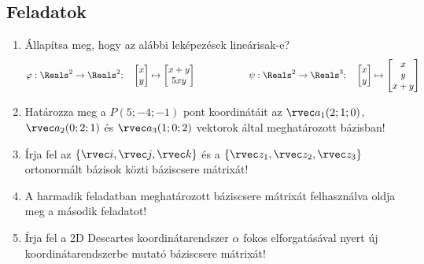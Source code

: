 \documentclass[a4paper, 12pt]{scrartcl}
\begin{document}
\clearpage
\subsection{Feladatok}
\begin{enumerate}
  \item Állapítsa meg, hogy az alábbi leképezések lineárisak-e?
        $$
          \varphi: \Reals^2 \to \Reals^2;
          \quad
          \begin{bmatrix}
            x \\
            y
          \end{bmatrix} \mapsto \begin{bmatrix}
            x+y \\
            5xy
          \end{bmatrix}
          \hspace{2cm}
          \psi: \Reals^2 \to \Reals^3;
          \quad
          \begin{bmatrix}
            x \\
            y
          \end{bmatrix} \mapsto \begin{bmatrix}
            x \\
            y \\
            x+y
          \end{bmatrix}
        $$

  \item Határozza meg a $P(5; -4; -1)$ pont koordinátáit az $\rvec a_1(2; 1;0)$,
        $\rvec a_2(0; 2; 1)$ és $\rvec a_3(1; 0; 2)$ vektorok által
        meghatározott bázisban!

  \item Írja fel az $\{ \rvec i, \rvec j, \rvec k \}$ és a $\{ \rvec z_1,
          \rvec z_2, \rvec z_3\}$ ortonormált bázisok közti báziscsere mátrixát!

  \item A harmadik feladatban meghatározott báziscsere mátrixát felhasználva
        oldja meg a második feladatot!

  \item Írja fel a 2D Descartes koordinátarendszer $\alpha$ fokos elforgatásával
        nyert új koordinátarendszerbe mutató báziscsere mátrixát!


\end{enumerate}
\end{document}
